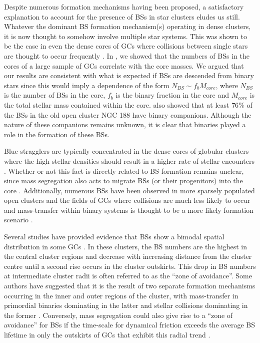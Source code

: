 Despite numerous formation
mechanisms having been proposed, a satisfactory explanation to account
for the presence of BSs in star clusters eludes us still.  Whatever the
dominant BS 
formation mechanism(s) operating in dense clusters, it is now
thought to somehow involve multiple star systems.  This was shown
to be the case in even the dense cores of GCs \citep{leigh07, leigh08,
  knigge09} where
collisions between single stars are thought to occur frequently
\citep{leonard89}.  In \citet{knigge09}, we showed that the numbers of
BSs in the cores
of a large sample of GCs correlate with the core masses.  We
argued that our results are consistent with what is expected if BSs
are descended from binary stars since this would imply a dependence of
the form $N_{BS} \sim f_bM_{core}$, where $N_{BS}$ is the number of
BSs in the core, $f_b$ is the binary fraction in the core and
$M_{core}$ is the total stellar mass contained within the core.
\citet{mathieu09} also showed 
that at least $76\%$ of the BSs in the old open cluster NGC 188 have
binary companions.  Although the nature of these companions remains
unknown, it is clear that binaries played a role in the
formation of these BSs.  

Blue stragglers are typically concentrated in the dense cores of
globular clusters where the high 
stellar densities should result in a higher rate of stellar encounters 
\citep[e.g.][]{leonard89}.  Whether or not this fact is
directly related to BS formation remains unclear, since mass segregation 
also acts to migrate BSs (or their progenitors) into the core 
\citep[e.g.][]{saviane98, guhathakurta98}.  Additionally, numerous BSs
have been observed in more sparsely populated open clusters
\citep[e.g.][]{andrievsky00} and the fields of GCs where
collisions are much less likely to occur and mass-transfer within
binary systems is thought to be a more likely formation scenario
\citep[e.g.][]{mapelli04}.  

Several studies have provided evidence
that BSs show a bimodal spatial distribution in some GCs
\citep{ferraro97, ferraro99, lanzoni07}.  In these clusters, the BS
numbers are the highest in the central cluster 
regions and decrease with increasing distance from the cluster centre
until a second rise occurs in the cluster outskirts.  
This drop in BS numbers at intermediate cluster radii is often
referred to as the ``zone of avoidance''.  Some authors have suggested
that it is the result of two separate formation mechanisms
occurring in the inner and outer regions of the cluster, with
mass-transfer in primordial binaries dominating in the latter and
stellar collisions dominating in the former
\citep{ferraro04, mapelli06}.  Conversely, mass segregation could also
give rise to a ``zone of avoidance'' for BSs if the time-scale for dynamical
friction exceeds the average BS lifetime in only the outskirts of GCs that
exhibit this radial trend \citep[e.g.][]{leigh11a}. 


